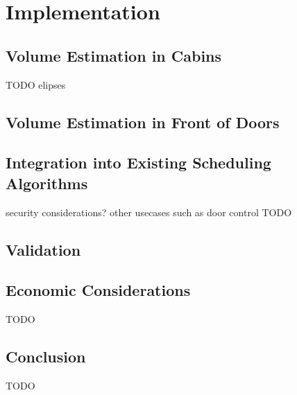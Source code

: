 \chapter{Implementation}
\label{chap:impl}

\section{Volume Estimation in Cabins}

TODO elipses \autocite[][Chap.~2]{starkosch2010handbook}

\section{Volume Estimation in Front of Doors}

\section{Integration into Existing Scheduling Algorithms}

security considerations?
other usecases such as door control
TODO

\section{Validation}

\section{Economic Considerations}

TODO

\section{Conclusion}

TODO